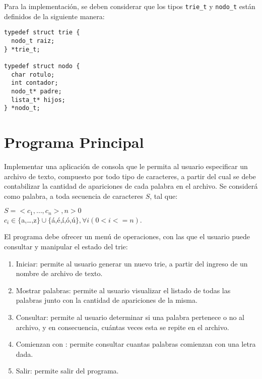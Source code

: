 \documentclass[12pt,a4paper]{article}
\begin{document}
Para la implementación, se deben considerar que los tipos \texttt{trie\_t} y \texttt{nodo\_t} están definidos de la siguiente manera:

\begin{verbatim}
typedef struct trie {
  nodo_t raiz;
} *trie_t;

typedef struct nodo {
  char rotulo;
  int contador;
  nodo_t* padre;
  lista_t* hijos;
} *nodo_t;
\end{verbatim}

\section{Programa Principal}
Implementar una aplicación de consola que le permita al usuario especificar un archivo de texto, compuesto por todo tipo de caracteres, a partir del cual se debe contabilizar la cantidad de apariciones de cada palabra en el archivo. Se considerá como palabra, a toda secuencia de caracteres $S$, tal que:
\begin{center}
$S=<c_1,\dots,c_n>, n>0$\\
$c_i \in \{$a,\dots,z$\} \cup \{$á,é,í,ó,ú$\}, \forall{i} (0<i<=n)$.
\end{center}

El programa debe ofrecer un menú de operaciones, con las que el usuario puede consultar y manipular el estado del trie:
\begin{enumerate}	
	\item Iniciar: permite al usuario generar un nuevo trie, a partir del ingreso de un nombre de archivo de texto.
	\item Mostrar palabras: permite al usuario visualizar el listado de todas las palabras junto con la cantidad de apariciones de la misma.
	\item Consultar: permite al usuario determinar si una palabra pertenece o no al archivo, y en consecuencia, cuántas veces esta se repite en el archivo.

	\item Comienzan con : permite consultar cuantas palabras comienzan con una letra dada.

	\item Salir: permite salir del programa.
\end{enumerate}
	
\end{document}
